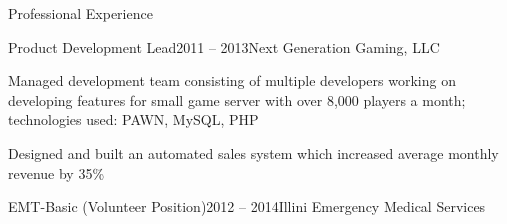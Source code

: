 \documentclass{resume} %
\begin{document}
\begin{rSection}{Professional Experience}

\begin{rSubsection}{Product Development Lead}{2011 -- 2013}{Next Generation Gaming, LLC}{}
  \item Managed development team consisting of multiple developers working on developing features for small game server with over 8,000 players a month; technologies used: PAWN, MySQL, PHP
  \item Designed and built an automated sales system which increased average monthly revenue by 35\%
\end{rSubsection}


\begin{rSubsectionNoList}{EMT-Basic (Volunteer Position)}{2012 -- 2014}{Illini Emergency Medical Services}{}
\end{rSubsectionNoList}

\end{rSection}

\end{document}
